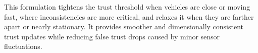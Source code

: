 \documentclass{ifacconf}
\begin{document}
This formulation tightens the trust threshold when vehicles are close or moving fast, where inconsistencies are more critical, and relaxes it when they are farther apart or nearly stationary. It provides smoother and dimensionally consistent trust updates while reducing false trust drops caused by minor sensor fluctuations.



\end{document}

